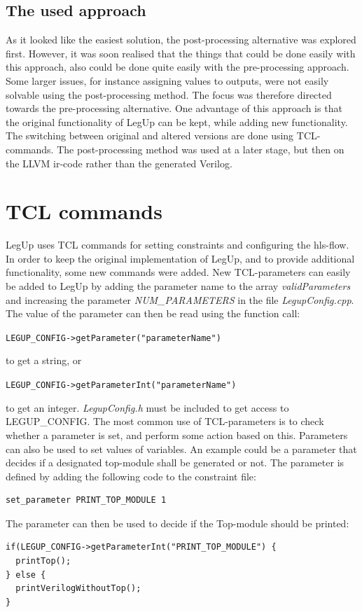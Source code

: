 \subsection{The used approach}
As it looked like the easiest solution, the post-processing alternative was explored first. However, it was soon realised that the things that could be done easily with this approach, also could be done quite easily with the pre-processing approach. Some larger issues, for instance assigning values to outputs, were not easily solvable using the post-processing method. The focus was therefore directed towards the pre-processing alternative. One advantage of this approach is that the original functionality of LegUp can be kept, while adding new functionality. The switching between original and altered versions are done using TCL-commands. The post-processing method was used at a later stage, but then on the LLVM \gls{ir}-code rather than the generated Verilog.

\section{TCL commands}
LegUp uses TCL commands for setting constraints and configuring the \gls{hls}-flow. In order to keep the original implementation of LegUp, and to provide additional functionality, some new commands were added. New TCL-parameters can easily be added to LegUp by adding the parameter name to the array \textit{validParameters} and increasing the parameter \textit{NUM\_PARAMETERS} in the file \textit{LegupConfig.cpp}. The value of the parameter can then be read using the function call:

\verb!LEGUP_CONFIG->getParameter("parameterName")!

to get a string, or 

\verb!LEGUP_CONFIG->getParameterInt("parameterName")! 

to get an integer. \textit{LegupConfig.h} must be included to get access to LEGUP\_CONFIG. The most common use of TCL-parameters is to check whether a parameter is set, and perform some action based on this. Parameters can also be used to set values of variables. An example could be a parameter that decides if a designated top-module shall be generated or not. The parameter is defined by adding the following code to the constraint file:

\begin{verbatim}
set_parameter PRINT_TOP_MODULE 1
\end{verbatim}
The parameter can then be used to decide if the Top-module should be printed:
\lstset{language=C++,style=Cstyle}
\begin{lstlisting}
if(LEGUP_CONFIG->getParameterInt("PRINT_TOP_MODULE") {
  printTop();
} else {
  printVerilogWithoutTop();
}
\end{lstlisting}

